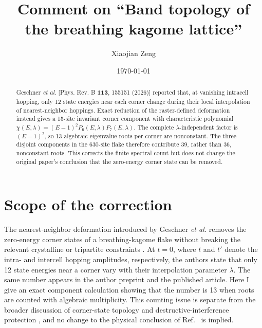 \documentclass[aps,prb,reprint,amsmath,amssymb,longbibliography]{revtex4-2}
\begin{document}
\title{Comment on ``Band topology of the breathing kagome lattice''}

\author{Xiaojian Zeng}

\date{\today}

\begin{abstract}
Geschner \emph{et al.} [Phys. Rev. B \textbf{113}, 155151 (2026)]
reported that, at vanishing intracell hopping, only 12 state energies near
each corner change during their local interpolation of nearest-neighbor
hoppings.  Exact reduction of the raster-defined deformation instead gives a
15-site invariant corner component with characteristic polynomial
$\chi(E,\lambda)=(E-1)^2P_6(E,\lambda)P_7(E,\lambda)$.  The complete
$\lambda$-independent factor is $(E-1)^2$, so 13 algebraic eigenvalue roots
per corner are nonconstant.  The three disjoint components in the
630-site flake therefore contribute 39, rather than 36, nonconstant roots.
This corrects the finite spectral count but does not change the original
paper's conclusion that the zero-energy corner state can be removed.
\end{abstract}

\maketitle

\section{Scope of the correction}

The nearest-neighbor deformation introduced by Geschner \emph{et al.}
removes the zero-energy corner states of a breathing-kagome flake without
breaking the relevant crystalline or tripartite constraints
\cite{Geschner2026}.  At $t=0$, where $t$ and $t'$ denote the intra- and
intercell hopping amplitudes, respectively, the authors state that only 12
state energies near a corner vary with their interpolation parameter
$\lambda$.  The same number appears in the author preprint and the published
article.  Here I give an exact component calculation showing that the number
is 13 when roots are counted with algebraic multiplicity.  This counting
issue is separate from the broader discussion of corner-state topology and
destructive-interference protection \cite{Herrera2022}, and no change to the
physical conclusion of Ref.~\cite{Geschner2026} is implied.
\end{document}
